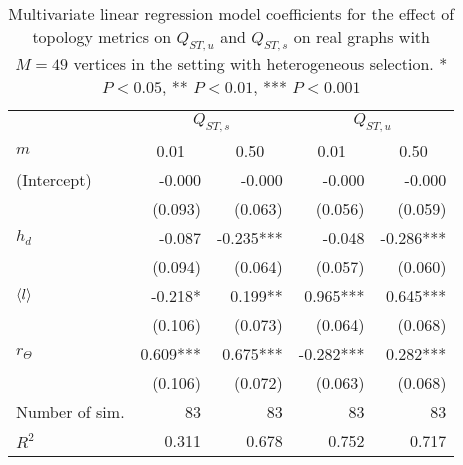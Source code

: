 \begin{table}
  \caption{Multivariate linear regression model coefficients for the effect of topology metrics on $Q_{ST,u}$ and $Q_{ST,s}$ on real graphs with $M=49$ vertices in the setting with heterogeneous selection. * $P < 0.05$,  ** $P < 0.01$, *** $P < 0.001$}
  \centering
    \begin{tabular}{lrrrr}
    \toprule
    &       \multicolumn{2}{c}{$Q_{ST,s}$}                           &               \multicolumn{2}{c}{$Q_{ST,u}$}        \\ 
    \cmidrule(lr){2-3} \cmidrule(lr){4-5} 
$m$            & \multicolumn{1}{c}{0.01} & \multicolumn{1}{c}{0.50} & \multicolumn{1}{c}{0.01} & \multicolumn{1}{c}{0.50} \\ 
    \hline
(Intercept) &                   -0.000 &                   -0.000 &                   -0.000 &                   -0.000  \\ 
            &                  (0.093) &                  (0.063) &                  (0.056) &                  (0.059)  \\ 
$h_d$       &                   -0.087 &                -0.235*** &                   -0.048 &                -0.286***  \\ 
            &                  (0.094) &                  (0.064) &                  (0.057) &                  (0.060)  \\ 
$\langle l \rangle$        &                  -0.218* &                  0.199** &                 0.965*** &                 0.645***  \\ 
            &                  (0.106) &                  (0.073) &                  (0.064) &                  (0.068)  \\ 
$r_\Theta$  &                 0.609*** &                 0.675*** &                -0.282*** &                 0.282***  \\ 
            &                  (0.106) &                  (0.072) &                  (0.063) &                  (0.068)  \\ 
\midrule
Number of sim.&                     83 &                       83 &                       83 &                       83  \\ 
$R^2$       &                    0.311 &                    0.678 &                    0.752 &                    0.717  \\ 
    \bottomrule
  \end{tabular}
\label{table:coefficients_realgraphs}
\end{table}
\FloatBarrier



